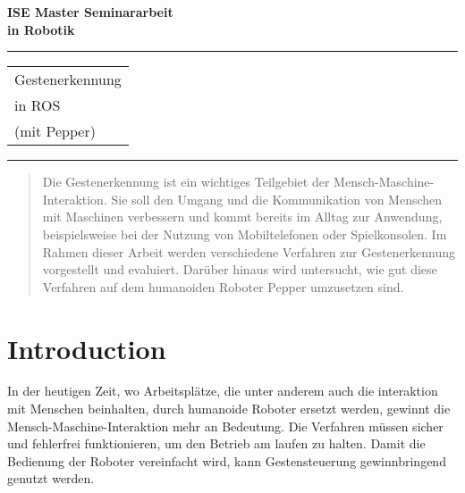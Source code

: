 \documentclass{llncs}
\begin{document}
\thispagestyle{empty}
\begin{flushleft}
\LARGE\bfseries ISE Master Seminararbeit\\
in Robotik\\[2cm]
\end{flushleft}
\rule{\textwidth}{1pt}
\vspace{2pt}
\begin{flushright}
\Huge
\begin{tabular}{@{}l}
Gestenerkennung\\
in ROS\\
(mit Pepper)\\[6pt]
\end{tabular}
\end{flushright}
\rule{\textwidth}{1pt}
\vfill
\newpage
\tableofcontents
\newpage
\begin{abstract}
Die Gestenerkennung ist ein wichtiges Teilgebiet der Mensch-Maschine-Interaktion. Sie soll den Umgang und die Kommunikation von Menschen mit Maschinen verbessern und kommt bereits im Alltag zur Anwendung, beispielsweise bei der Nutzung von Mobiltelefonen oder Spielkonsolen. Im Rahmen dieser Arbeit werden verschiedene Verfahren zur Gestenerkennung vorgestellt und evaluiert. Dar\"uber hinaus wird untersucht, wie gut diese Verfahren auf dem humanoiden Roboter \glqq Pepper\grqq\hspace{1pt} umzusetzen sind.

\end{abstract}

%
\section{Introduction}
In der heutigen Zeit, wo Arbeitspl\"atze, die unter anderem auch die interaktion mit Menschen beinhalten, durch humanoide Roboter ersetzt werden, gewinnt die Mensch-Maschine-Interaktion mehr an Bedeutung. Die Verfahren m\"ussen sicher und fehlerfrei funktionieren, um den Betrieb am laufen zu halten. Damit die Bedienung der Roboter vereinfacht wird, kann Gestensteuerung gewinnbringend genutzt werden.\\
\end{document}

